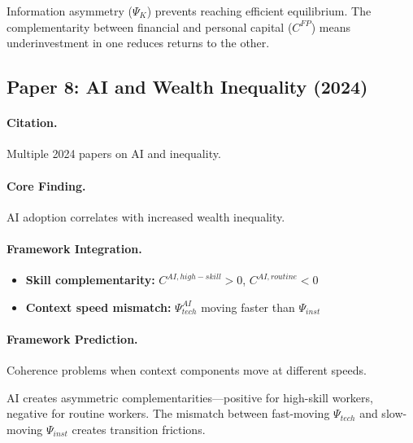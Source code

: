 \begin{tcolorbox}[colback=yellow!5!white, colframe=yellow!75!black,
    title=EBF Insight: Human Capital]
Information asymmetry ($\Psi_K$) prevents reaching efficient equilibrium.
The complementarity between financial and personal capital ($C^{FP}$)
means underinvestment in one reduces returns to the other.
\end{tcolorbox}


\subsection{Paper 8: AI and Wealth Inequality (2024)}

\paragraph{Citation.}
Multiple 2024 papers on AI and inequality.

\paragraph{Core Finding.}
AI adoption correlates with increased wealth inequality.

\paragraph{Framework Integration.}
\begin{itemize}
  \item \textbf{Skill complementarity:} $C^{AI,high-skill} > 0$, $C^{AI,routine} < 0$
  \item \textbf{Context speed mismatch:} $\Psi_{tech}^{AI}$ moving faster than $\Psi_{inst}$
\end{itemize}

\paragraph{Framework Prediction.}
Coherence problems when context components move at different speeds.

\begin{tcolorbox}[colback=yellow!5!white, colframe=yellow!75!black,
    title=EBF Insight: AI and Inequality]
AI creates asymmetric complementarities---positive for high-skill workers,
negative for routine workers. The mismatch between fast-moving $\Psi_{tech}$
and slow-moving $\Psi_{inst}$ creates transition frictions.
\end{tcolorbox}


